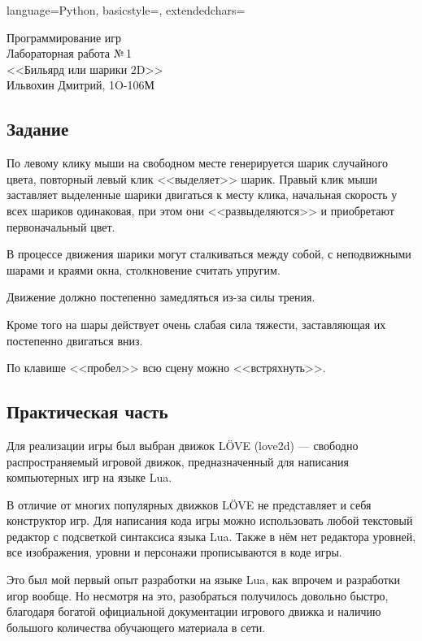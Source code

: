 \documentclass[12pt]{article}
\newcommand{\StudentName}{Ильвохин Дмитрий}
\newcommand{\Group}{1O-106М}
\newcommand{\CourseName}{Программирование игр}
\newcommand{\LabNum}{1}
\newcommand{\Subject}{Бильярд или шарики 2D}
\begin{document}
\lstset
{
        language=Python,
        basicstyle=\footnotesize,%
        extendedchars=\true
}

\begin{flushright}
\Large{
	\CourseName \\
	Лабораторная работа №\,\LabNum \\
	<<\Subject>> \\
	\StudentName, \Group \\
}
\end{flushright}

\subsection*{Задание}
По левому клику мыши на свободном месте генерируется шарик случайного цвета,
повторный левый клик <<выделяет>> шарик. Правый клик мыши заставляет выделенные
шарики двигаться к месту клика, начальная скорость у всех шариков одинаковая,
при этом они <<развыделяются>> и приобретают первоначальный цвет.

В процессе движения шарики могут сталкиваться между собой, с неподвижными шарами
и краями окна, столкновение считать упругим.

Движение должно постепенно замедляться из-за силы трения.

Кроме того на шары действует очень слабая сила тяжести, заставляющая
их постепенно двигаться вниз.

По клавише <<пробел>> всю сцену можно <<встряхнуть>>.

\subsection*{Практическая часть}
Для реализации игры был выбран движок LÖVE (love2d) --- свободно распространяемый игровой движок,
предназначенный для написания компьютерных игр на языке Lua.

В отличие от многих популярных движков LÖVE не представляет и себя конструктор игр.
Для написания кода игры можно использовать любой текстовый редактор с подсветкой синтаксиса языка Lua.
Также в нём нет редактора уровней, все изображения, уровни и персонажи прописываются в коде игры.~\cite{love}

Это был мой первый опыт разработки на языке Lua, как впрочем и разработки
игор вообще. Но несмотря на это, разобраться получилось довольно быстро,
благодаря богатой официальной документации игрового движка и наличию
большого количества обучающего материала в сети.
\end{document}
